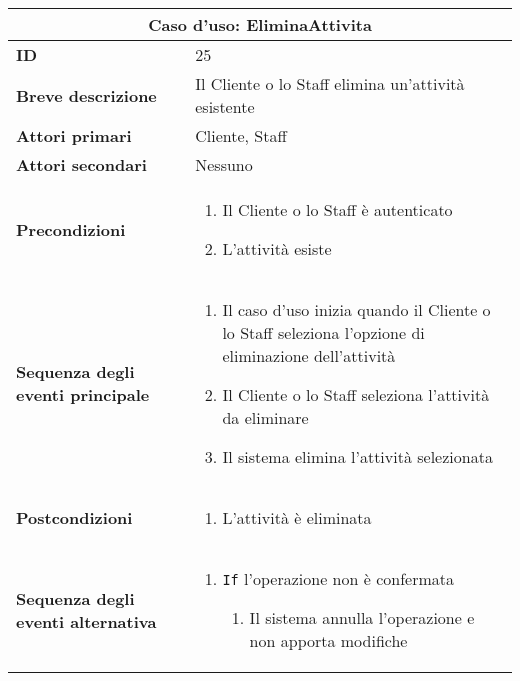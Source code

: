 \documentclass[a4paper]{report}
\begin{document}
\clearpage
\begin{table}[H]
\vspace*{-0cm}
\renewcommand{\arraystretch}{1.9}
\begin{tabular}{|p{3.9cm}|p{9.9cm}|}
\hline
\multicolumn{2}{|c|}{\textbf{Caso d’uso: EliminaAttivita}} \\ \hline
	\textbf{ID} & 25 \\ \hline
	\textbf{Breve descrizione} & Il Cliente o lo Staff elimina un’attività esistente \\ \hline
	\textbf{Attori primari} & Cliente, Staff \\ \hline
	\textbf{Attori secondari} & Nessuno \\ \hline
	\textbf{Precondizioni} & \begin{enumerate}[leftmargin=14pt,label=\arabic*.,labelsep=0.5em,topsep=0pt,partopsep=0pt,parsep=0pt,itemsep=0pt]
    \item Il Cliente o lo Staff è autenticato
    \item L’attività esiste
\end{enumerate} \\ \hline
	\textbf{Sequenza degli eventi principale} & \begin{enumerate}[leftmargin=14pt,label=\arabic*.,labelsep=0.5em,topsep=0pt,partopsep=0pt,parsep=0pt,itemsep=0pt]
    \item Il caso d'uso inizia quando il Cliente o lo Staff seleziona l'opzione di eliminazione dell'attività
    \item Il Cliente o lo Staff seleziona l'attività da eliminare
    \item Il sistema elimina l’attività selezionata
\end{enumerate} \\ \hline
	\textbf{Postcondizioni} & \begin{enumerate}[label=\arabic*.,leftmargin=14pt,labelsep=0.5em,topsep=0pt,partopsep=0pt,parsep=0pt,itemsep=0pt]
        \item L’attività è eliminata
    \end{enumerate} \\ \hline
	\textbf{Sequenza degli eventi alternativa} & \begin{enumerate}[leftmargin=14pt,label=\arabic*.,labelsep=0.5em,topsep=0pt,partopsep=0pt,parsep=0pt,itemsep=0pt]
    \item \texttt{If} l'operazione non è confermata
    \begin{enumerate}[label=\arabic{enumi}.\arabic*.,leftmargin=22pt,labelsep=0.5em,topsep=0pt,partopsep=0pt,parsep=0pt,itemsep=0pt]
        \item Il sistema annulla l’operazione e non apporta modifiche
    \end{enumerate}
\end{enumerate} \\ \hline
\end{tabular}
\end{table}
\end{document}
